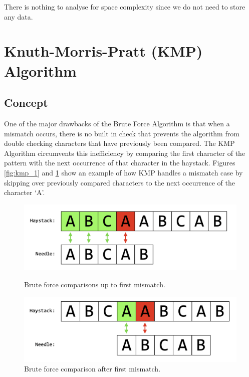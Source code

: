 \noindent
There is nothing to analyse for space complexity since we do not need to store any data.

\section*{Knuth-Morris-Pratt (KMP) Algorithm}

\subsection*{Concept}
One of the major drawbacks of the Brute Force Algorithm is that when a mismatch occurs, there is no built in check that prevents the algorithm from double checking characters that have previously been compared. The KMP Algorithm circumvents this inefficiency by comparing the first character of the pattern with the next occurrence of that character in the haystack. Figures \ref{fig:kmp_1} and \ref{fig:kmp_2} show an example of how KMP handles a mismatch case by skipping over previously compared characters to the next occurrence of the character `A'.

\begin{figure}[H]
  \centering
  \begin{minipage}[b]{0.4\textwidth}
    \includegraphics[width=\textwidth]{images/kmp_1.png}
    \caption{Brute force comparisons up to first mismatch.}
    \label{fig:kmp_1}
  \end{minipage}
  \hfill
  \begin{minipage}[b]{0.4\textwidth}
    \includegraphics[width=\textwidth]{images/kmp_2.png}
    \caption{Brute force comparison after first mismatch.}
    \label{fig:kmp_2}
  \end{minipage}
\end{figure}

